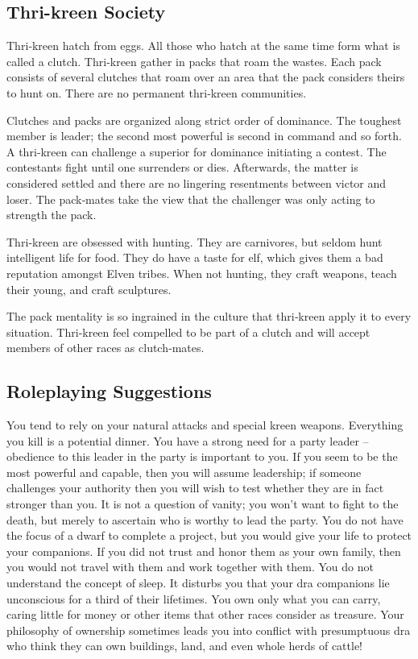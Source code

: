 \subsection{Thri-kreen Society}

Thri‐kreen hatch from eggs. All those who hatch at the same time form what is called a clutch. Thri‐kreen gather in packs that roam the wastes. Each pack consists of several clutches that roam over an area that the pack considers theirs to hunt on. There are no permanent thri‐kreen communities.

Clutches and packs are organized along strict order of dominance. The toughest member is leader; the second most powerful is second in command and so forth. A thri‐kreen can challenge a superior for dominance initiating a contest. The contestants fight until one surrenders or dies. Afterwards, the matter is considered settled and there are no lingering resentments between victor and loser. The pack‐mates take the view that the challenger was only acting to strength the pack.

Thri‐kreen are obsessed with hunting. They are carnivores, but seldom hunt intelligent life for food. They do have a taste for elf, which gives them a bad reputation amongst Elven tribes. When not hunting, they craft weapons, teach their young, and craft sculptures.

The pack mentality is so ingrained in the culture that thri‐kreen apply it to every situation. Thri‐kreen feel compelled to be part of a clutch and will accept members of other races as clutch‐mates.

\subsection{Roleplaying Suggestions}

You tend to rely on your natural attacks and special kreen weapons. Everything you kill is a potential dinner. You have a strong need for a party leader – obedience to this leader in the party is important to you. If you seem to be the most powerful and capable, then you will assume leadership; if someone challenges your authority then you will wish to test whether they are in fact stronger than you. It is not a question of vanity; you won’t want to fight to the death, but merely to ascertain who is worthy to lead the party. You do not have the focus of a dwarf to complete a project, but you would give your life to protect your companions. If you did not trust and honor them as your own family, then you would not travel with them and work together with them. You do not understand the concept of sleep. It disturbs you that your dra companions lie unconscious for a third of their lifetimes. You own only what you can carry, caring little for money or other items that other races consider as treasure. Your philosophy of ownership sometimes leads you into conflict with presumptuous dra who think they can own buildings, land, and even whole herds of cattle!

